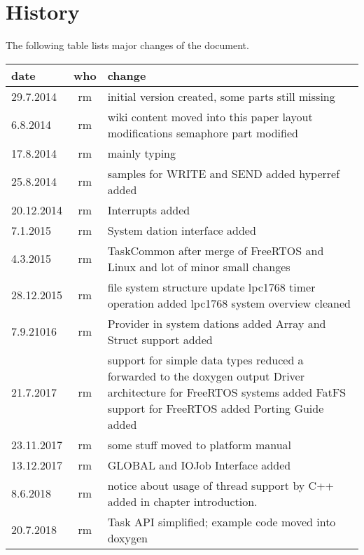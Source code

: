 \chapter*{History}
The following table lists major changes of the document.

\begin{tabular}{|l|c|p{10cm}|}
\hline
date & who & change \\
\hline
29.7.2014 & rm & initial version created, some parts still missing \\
6.8.2014 & rm & wiki content moved into this paper \newline
                layout modifications\newline
                semaphore part modified\\
17.8.2014 & rm & mainly typing \\
25.8.2014 & rm & samples for WRITE and SEND added \newline
		 hyperref added\\
20.12.2014 & rm & Interrupts added \\
7.1.2015 & rm & System dation interface added \\
4.3.2015 & rm &  TaskCommon after merge of FreeRTOS and Linux \newline
and lot of minor small changes \\
28.12.2015 & rm & file system structure update \newline
                  lpc1768 timer operation added \newline
                  lpc1768 system overview cleaned \\
7.9.21016 & rm & Provider in system dations added\newline
                 Array and Struct support added\\
21.7.2017 & rm & support for simple data types reduced
                 a forwarded to the doxygen output \newline
                 Driver architecture for FreeRTOS systems added \newline
                 FatFS support for FreeRTOS added \newline
                 Porting Guide added \\
23.11.2017 & rm & some stuff moved to platform manual\\
13.12.2017 & rm & GLOBAL and IOJob Interface added \\
8.6.2018 & rm & notice about usage of thread support by C++ added in chapter
                introduction.\\
20.7.2018 & rm & Task API simplified; example code moved into doxygen \\
\hline
\end{tabular} 
